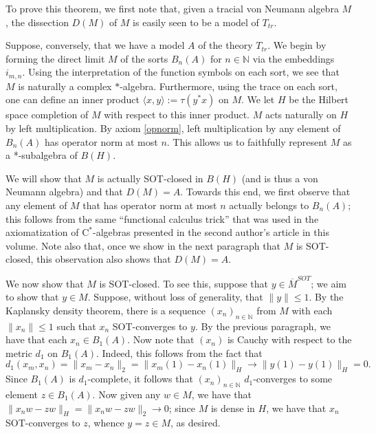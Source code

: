 \documentclass[12pt]{amsart}
\theoremstyle{definition}
\def\bb{\mathbb}
\def\bb{\mathbb}
\newcommand{\cstar}{$\mathrm{C}^*$}
\newcommand\bN{{\mathbb N}}
\begin{document}
To prove this theorem, we first note that, given a tracial von Neumann algebra $M$, the dissection $D(M)$ of $M$ is easily seen to be a model of $T_{tr}$. 

Suppose, conversely, that we have a model $A$ of the theory $T_{tr}$.  We begin by forming the direct limit $M$ of the sorts $B_n(A)$ for $n \in \bN$ via the embeddings $i_{m,n}$.  Using the interpretation of the function symbols on each sort, we see that $M$ is naturally a complex $*$-algebra.  Furthermore, using the trace on each sort, one can define an inner product $\langle x,y \rangle := \tau(y^*x)$ on $M$.  We let $H$ be the Hilbert space completion of $M$ with respect to this inner product.  $M$ acts naturally on $H$ by left multiplication. By axiom \ref{opnorm}, left multiplication by any element of $B_n(A)$ has operator norm at most $n$. This allows us to faithfully represent $M$ as a *-subalgebra of $B(H)$.  

We will show that $M$ is actually SOT-closed in $B(H)$ (and is thus a von Neumann algebra) and that $D(M)=A$.  Towards this end, we first observe that any element of $M$ that has operator norm at most $n$ actually belongs to $B_n(A)$; this follows from the same ``functional calculus trick'' that was used in the axiomatization of \cstar-algebras presented in the second author's article in this volume.  Note also that, once we show in the next paragraph that $M$ is SOT-closed, this observation also shows that $D(M)=A$.

We now show that $M$ is SOT-closed.  To see this, suppose that $y\in \overline{M}^{SOT}$; we aim to show that $y\in M$.  Suppose, without loss of generality, that $\|y\|\leq 1$.  By the Kaplansky density theorem, there is a sequence $(x_n)_{n\in \bb N}$ from $M$ with each $\|x_n\|\leq 1$ such that $x_n$ SOT-converges to $y$.  By the previous paragraph, we have that each $x_n\in B_1(A)$.  Now note that $(x_n)$ is Cauchy with respect to the metric $d_1$ on $B_1(A)$.  Indeed, this follows from the fact that 
\[
d_1(x_m,x_n)=\|x_m-x_n\|_2=\|x_m(1)-x_n(1)\|_H\to \|y(1)-y(1)\|_H=0.
\]
Since $B_1(A)$ is $d_1$-complete, it follows that $(x_n)_{n\in \bb N}$ $d_1$-converges to some element $z\in B_1(A)$.  Now given any $w\in M$, we have that $\|x_nw-zw\|_H=\|x_nw-zw\|_2\to 0$; since $M$ is dense in $H$, we have that $x_n$ SOT-converges to $z$, whence $y=z\in M$, as desired.


\end{document}
